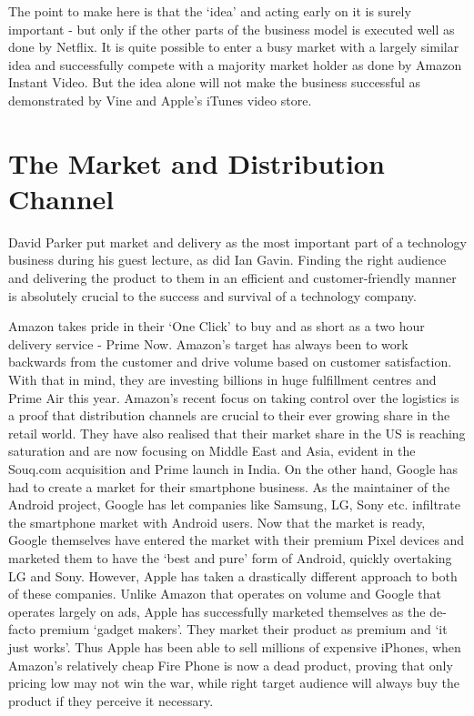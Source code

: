 \documentclass[twocolumn]{bmcart}%
\begin{document}
\par The point to make here is that the `idea' and acting early on it is surely important - but only if the other parts of the business model is executed well as done by Netflix. It is quite possible to enter a busy market with a largely similar idea and successfully compete with a majority market holder as done by Amazon Instant Video. But the idea alone will not make the business successful as demonstrated by Vine and Apple's iTunes video store.

\section*{The Market and Distribution Channel}
David Parker put market and delivery as the most important part of a technology business during his guest lecture, as did Ian Gavin. Finding the right audience and delivering the product to them in an efficient and customer-friendly manner is absolutely crucial to the success and survival of a technology company.\\

\par Amazon takes pride in their `One Click' to buy and as short as a two hour delivery service - Prime Now. Amazon's target has always been to work backwards from the customer and drive volume based on customer satisfaction. With that in mind, they are investing billions in huge fulfillment centres and Prime Air this year. Amazon's recent focus on taking control over the logistics is a proof that distribution channels are crucial to their ever growing share in the retail world. They have also realised that their market share in the US is reaching saturation and are now focusing on Middle East and Asia, evident in the Souq.com acquisition and Prime launch in India. On the other hand, Google has had to create a market for their smartphone business. As the maintainer of the Android project, Google has let companies like Samsung, LG, Sony etc. infiltrate the smartphone market with Android users. Now that the market is ready, Google themselves have entered the market with their premium Pixel devices and marketed them to have the `best and pure' form of Android, quickly overtaking LG and Sony. However, Apple has taken a drastically different approach to both of these companies. Unlike Amazon that operates on volume and Google that operates largely on ads, Apple has successfully marketed themselves as the de-facto premium `gadget makers'. They market their product as premium and `it just works'. Thus Apple has been able to sell millions of expensive iPhones, when Amazon's relatively cheap Fire Phone is now a dead product, proving that only pricing low may not win the war, while right target audience will always buy the product if they perceive it necessary.\\
\end{document}
